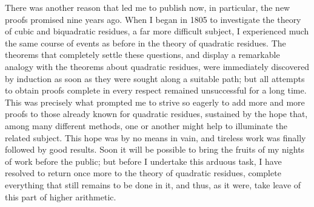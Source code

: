 \newpage
There was another reason that led me to publish now, in particular, the new proofs promised nine years ago. When I began in 1805 to investigate the theory of cubic and biquadratic residues, a far more difficult subject, I experienced much the same course of events as before in the theory of quadratic residues. The theorems that completely settle these questions, and display a remarkable analogy with the theorems about quadratic residues, were immediately discovered by induction as soon as they were sought along a suitable path; but all attempts to obtain proofs complete in every respect remained unsuccessful for a long time. This was precisely what prompted me to strive so eagerly to add more and more proofs to those already known for quadratic residues, sustained by the hope that, among many different methods, one or another might help to illuminate the related subject. This hope was by no means in vain, and tireless work was finally followed by good results. Soon it will be possible to bring the fruits of my nights of work before the public; but before I undertake this arduous task, I have resolved to return once more to the theory of quadratic residues, complete everything that still remains to be done in it, and thus, as it were, take leave of this part of higher arithmetic.
